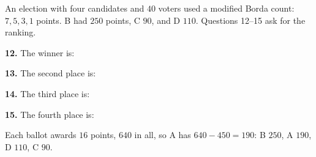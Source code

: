 \documentclass[12pt]{ximera}
\begin{document}
\begin{problem}
An election with four candidates and $40$ voters used a modified Borda count: $7,5,3,1$ points. B had $250$ points, C $90$, and D $110$. Questions 12--15 ask for the ranking.

\begin{prompt}
\textbf{12.} The winner is:
\begin{multipleChoice}
\end{multipleChoice}
\end{prompt}

\begin{prompt}
\textbf{13.} The second place is:
\begin{multipleChoice}
\end{multipleChoice}
\end{prompt}

\begin{prompt}
\textbf{14.} The third place is:
\begin{multipleChoice}
\end{multipleChoice}
\end{prompt}

\begin{prompt}
\textbf{15.} The fourth place is:
\begin{multipleChoice}
\end{multipleChoice}
\begin{feedback}
Each ballot awards $16$ points, $640$ in all, so A has $640-450=190$: B $250$, A $190$, D $110$, C $90$.
\end{feedback}
\end{prompt}
\end{problem}
\end{document}
